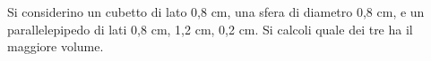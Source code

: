 Si considerino un cubetto di lato 0,8 cm, una sfera di diametro 0,8 cm, 
e un parallelepipedo di lati 0,8 cm, 1,2 cm, 0,2 cm. 
Si calcoli quale dei tre ha il maggiore volume.
